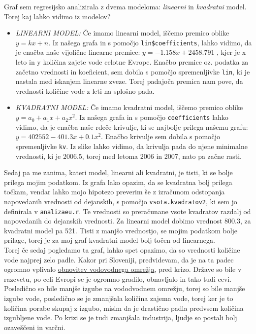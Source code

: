 \documentclass[11pt,a4paper]{article}
\begin{document}
\newpage
{}

Graf sem regresijsko analizirala z dvema modeloma: \emph{linearni} in \emph{kvadratni} model.\\
Torej kaj lahko vidimo iz modelov?
\begin{itemize}
\item{\emph{LINEARNI MODEL:} Če imamo linearni model, iščemo premico oblike $y = kx + n$. Iz našega grafa in s pomočjo \verb|lin$coefficients|, lahko vidimo, da je enačba naše vijolične linearne premice: $y = -1.158x + 2458.791$ , kjer je x leto in y količina zajete vode celotne Evrope. Enačbo premice oz. podatka za začetno vrednosti in koeficient, sem dobila s pomočjo spremenljivke \verb|lin|, ki je nastala med iskanjem linearne zveze. Torej padajoča premica nam pove, da vrednosti količine vode z leti na splošno pada.}

\item{\emph{KVADRATNI MODEL:} Če imamo kvadratni model, iščemo premico oblike $y = a_0 + a_1x +a_2x^2$. Iz našega grafa in s pomočjo \verb|coefficients| lahko vidimo, da je enačba naše rdeče krivulje, ki se najbolje prilega našemu grafu: $y = 402552 - 401.3x + 0.1x^2$. Enačbo krivulje sem dobila s pomočjo spremenljivke \verb|kv|. Iz slike lahko vidimo, da krivulja pada do njene minimalne vrednosti, ki je 2006.5, torej med letoma 2006 in 2007, nato pa začne rasti.}
\end{itemize}

Sedaj pa me zanima, kateri model, linearni ali kvadratni, je tisti, ki se bolje prilega mojim podatkom. Iz grafa lako opazim, da se kvadratna bolj prilega točkam, vendar lahko mojo hipotezo preverim še z izračunom odstopanja napovedanih vrednosti od dejanskih, s pomočjo \verb|vsota.kvadratov2|, ki sem jo definirala v \verb|analizaeu.r|. Te vrednosti so preračunane vsote kvadratov razdalj od napovedanih do dejanskih vrednosti. Za linearni model dobimo vrednost 800.3, za kvadratni model pa 521. Tisti z manjšo vrednostjo, se mojim podatkom bolje prilage, torej je za moj graf kvadratni model bolj točen od linearnega.\\

Torej če sedaj pogledamo ta graf, lahko spet opazimo, da so vrednosti količine vode najprej zelo  padle. Kakor pri Sloveniji, predvidevam, da je na ta padec ogromno vplivalo \underline{obnovitev vodovodnega omrežja}, pred krizo. Države so bile v razcvetu, po celi Evropi se je ogromno gradilo, obnavljalo in tako tudi cevi.  Posledično so bile manjše izgube na vododvodnem omrežju, torej so bile manjše izgube vode, posledično se je zmanjšala količina zajema vode, torej ker je to količina porabe skupaj z izgubo, mislm da je drastično padla predvsem količina izgubljene vode.  Po krizi se je tudi zmanjšala industrija, ljudje so postali bolj ozaveščeni in varčni.\\
\end{document}
